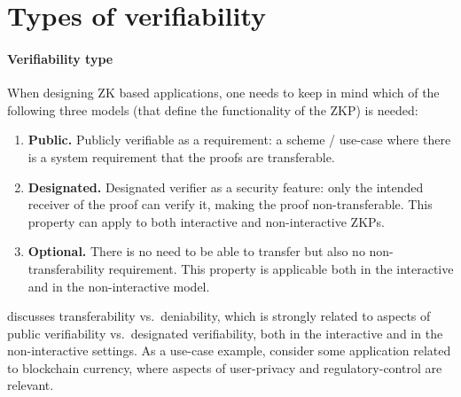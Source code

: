 \section{Types of verifiability}
\label{apps:scope-use-cases}


\paragraph{Verifiability type}
When designing ZK based applications, one needs to keep in mind which of the following three models (that define the functionality of the ZKP) is needed:


\begin{enumerate}
    \item \textbf{Public.}
	Publicly verifiable as a requirement: a scheme / use-case where 
	there is a system requirement that the proofs are transferable. %

    \item \textbf{Designated.} 
	Designated verifier as a security feature: only the intended receiver of the proof can verify it, making the proof non-transferable. 
	This property can apply to both interactive and non-interactive ZKPs.
	
    \item \textbf{Optional.} %
	There is no need to be able to transfer but also no non-transferability requirement. %
	This property is applicable both in the interactive and in the non-interactive model.
\end{enumerate}


 discusses transferability vs.\ deniability, which is strongly related to aspects of public verifiability vs.\ designated verifiability,
both in the interactive and in the non-interactive settings.
As a use-case example, consider some application related to blockchain currency, where aspects of user-privacy and regulatory-control are relevant.
	
